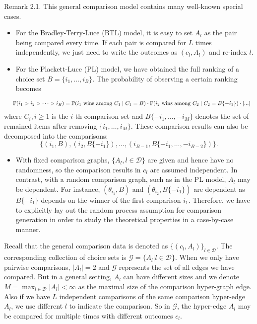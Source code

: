 Remark 2.1. This general comparison model contains many well-known special cases.
\begin{itemize}
\item
  For the Bradley-Terry-Luce (BTL) model, it is easy to set \(A_{l}\) as the pair being compared every time. If each pair is compared for \(L\) times independently, we just need to write the outcomes as \((c_{l}, A_{l})\) and re-index \(l\).
\item
  For the Plackett-Luce (PL) model, we have obtained the full ranking of a choice set \(B = \{i_{1}, \dots , i_{B}\}\). The probability of observing a certain ranking becomes
\end{itemize}
\[
\begin{array}{r l} & {\mathbb{P}(i_{1} > i_{2} > \dots >i_{B}) = \mathbb{P}(i_{1}\mathrm{~wins~among~}C_{1}\mid C_{1} = B)\cdot \mathbb{P}(i_{2}\mathrm{~wins~among~}C_{2}\mid C_{2} = B\{-i_{1}\})\cdot[...]}
\end{array}
\]
where \(C_{i}, i \geq 1\) is the \(i\)-th comparison set and \(B\{- i_{1}, \dots , - i_{M}\}\) denotes the set of remained items after removing \(\{i_{1}, \dots , i_{M}\}\). These comparison results can also be decomposed into the comparisons:
\[
\{(i_{1}, B), (i_{2}, B\{-i_{1}\}), \dots , (i_{B - 1}, B\{-i_{1}, \dots , -i_{B - 2}\})\} .
\]
\begin{itemize}
\tightlist
\item
  With fixed comparison graphs, \(\{A_{l},l\in \mathcal{D}\}\) are given and hence have no randomness, so the comparison results in \(c_{l}\) are assumed independent. In contrast, with a random comparison graph, such as in the PL model, \(A_{l}\) may be dependent. For instance, \((\theta_{i_{1}},B)\) and \((\theta_{i_{2}},B\{-i_{1}\})\) are dependent as \(B\{-i_{1}\}\) depends on the winner of the first comparison \(i_{1}\). Therefore, we have to explicitly lay out the random process assumption for comparison generation in order to study the theoretical properties in a case-by-case manner.
\end{itemize}

Recall that the general comparison data is denoted as \(\{(c_{l},A_{l})\}_{l\in \mathcal{D}}\). The corresponding collection of choice sets is \(\mathcal{G} = \{A_{l}|l\in \mathcal{D}\}\). When we only have pairwise comparisons, \(|A_{l}| = 2\) and \(\mathcal{G}\) represents the set of all edges we have compared. But in a general setting, \(A_{l}\) can have different sizes and we denote \(M = \max_{l\in \mathcal{D}}|A_{l}|< \infty\) as the maximal size of the comparison hyper-graph edge. Also if we have \(L\) independent comparisons of the same comparison hyper-edge \(A_{l}\), we use different \(l\) to indicate the comparison. So in \(\mathcal{G}\), the hyper-edge \(A_{l}\) may be compared for multiple times with different outcomes \(c_{l}\).

